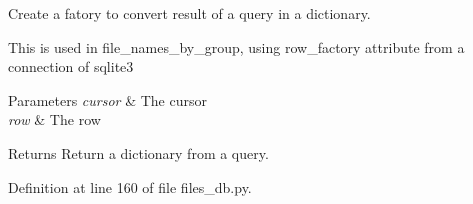Create a fatory to convert result of a query in a dictionary. 

This is used in \textquotesingle{}file\+\_\+names\+\_\+by\+\_\+group\textquotesingle{}, using row\+\_\+factory attribute from a connection of sqlite3


\begin{DoxyParams}{Parameters}
{\em cursor} & The cursor \\
\hline
{\em row} & The row\\
\hline
\end{DoxyParams}
\begin{DoxyReturn}{Returns}
Return a dictionary from a query. 
\end{DoxyReturn}


Definition at line 160 of file files\+\_\+db.\+py.

